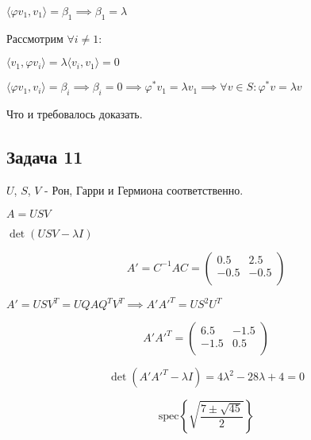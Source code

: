 \documentclass[a4paper,12pt]{article}
\begin{document}
$\langle \varphi v_1, v_1 \rangle = \beta_1 \implies \beta_1 = \lambda$ 

Рассмотрим $\forall i \neq 1$:

$\langle v_1, \varphi v_i \rangle = \lambda \langle v_i, v_1 \rangle = 0$

$\langle \varphi v_1, v_i \rangle = \beta_i \implies \beta_i = 0 \implies \varphi^*v_1 = \lambda v_1 \implies \forall v \in S: \varphi^*v = \lambda v$

Что и требовалось доказать.

\subsection{Задача 11}
$U$, $S$, $V$ - Рон, Гарри и Гермиона соответственно. 

$A = USV$

$\det(USV - \lambda I)$

\[
A' = C^{-1}AC = \begin{pmatrix}
    0.5 & 2.5 \\
    -0.5 & -0.5 \\
\end{pmatrix}
\]

$A'=USV^T=UQAQ^TV^T \implies A'A'^T = US^2U^T$

\[
A'A'^T = \begin{pmatrix}
    6.5 & -1.5 \\
    -1.5 & 0.5 \\
\end{pmatrix}
\]

\[
\det(A'A'^T - \lambda I) = 4\lambda^2 - 28\lambda + 4 = 0
\]

\[
\text{spec} \left\{\sqrt{\frac{7\pm\sqrt{45}}{2}}\right\}
\]
\end{document}
